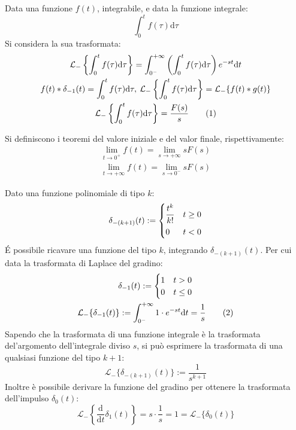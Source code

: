 \documentclass{article}
\numberwithin{equation}{subsection}
\newcommand{\df}{\mathrm{d}}
\newcommand{\tageq}{\tag{\stepcounter{equation}\theequation}}
\newcommand{\Frac}[2]{\displaystyle\frac{\strut{#1}}{\strut{#2}}}
\begin{document}
Data una funzione $f(t)$, integrabile, e data la funzione integrale: 
\begin{equation*}
    \displaystyle\int_{0}^{t}f(\tau)\df\tau
\end{equation*}
Si considera la sua trasformata:
\begin{gather*}
    \mathcal{L}_-\left\{\displaystyle\int_{0}^{t}f(\tau)\df\tau\right\}=\int_{0^-}^{+\infty}\left(\int_{0}^{t}f(\tau)\df\tau\right)e^{-st}\df t\\
    f(t)*\delta_{-1}(t)=\displaystyle\int_{0}^{t}f(\tau)\df\tau,\:\mathcal{L}_-\left\{\displaystyle\int_{0}^{t}f(\tau)\df\tau\right\}=\mathcal{L}_-\{f(t)*g(t)\}\\
    \mathcal{L}_-\left\{\displaystyle\int_{0}^{t}f(\tau)\df\tau\right\}=\frac{F(s)}{s}\tageq
\end{gather*}

Si definiscono i teoremi del valore iniziale e del valor finale, rispettivamente:
\begin{gather}
    \lim_{t\to0^+}f(t)=\lim_{s\to+\infty}sF(s)\\
    \lim_{t\to+\infty}f(t)=\lim_{s\to0^-}sF(s)
\end{gather}

Dato una funzione polinomiale di tipo $k$:
\begin{equation}
    \delta_{-(k+1)}(t):=
    \begin{cases}
        \displaystyle\Frac{t^{k}}{k!}&t\geq0\\
        0&t<0
    \end{cases}
\end{equation}
\'{E} possibile ricavare una funzione del tipo $k$, integrando $\delta_{-(k+1)}(t)$. Per cui data la trasformata di Laplace del gradino:
\begin{gather*}
    \delta_{-1}(t):=
    \begin{cases}
        1 &t>0\\
        0 &t\leq0
    \end{cases}\\
    \mathcal{L}_-\{\delta_{-1}(t)\}:=\displaystyle\int_{0^-}^{+\infty}1\cdot e^{-st}\df t=\frac{1}{s}\tageq
\end{gather*}
Sapendo che la trasformata di una funzione integrale è la trasformata del'argomento dell'integrale diviso $s$, si può esprimere la trasformata di una qualsiasi 
funzione del tipo $k+1$:
\begin{equation}
    \mathcal{L}_-\{\delta_{-(k+1)}(t)\}:=\displaystyle\frac{1}{s^{k+1}}
\end{equation}
Inoltre è possibile derivare la funzione del gradino per ottenere la trasformata dell'impulso $\delta_0(t)$:
\begin{equation}
    \mathcal{L}_-\left\{\displaystyle\frac{\df}{\df t}\delta_1(t)\right\}=s\cdot\frac{1}{s}=1=\mathcal{L}_-\{\delta_0(t)\}
\end{equation}
\end{document}
